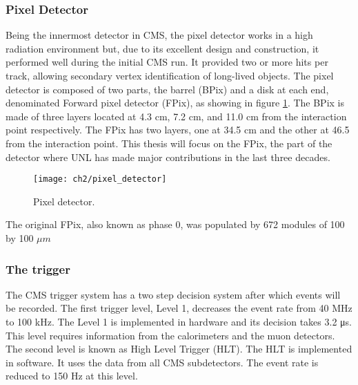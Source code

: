 \subsubsection{Pixel Detector}
Being the innermost detector in CMS, the pixel detector works in a high radiation environment but, due to its excellent design and construction, it performed well during the initial CMS run. It provided two or more hits per track, allowing secondary vertex identification of long-lived objects. The pixel detector is composed of two parts, the barrel (BPix) and a disk at each end, denominated Forward pixel detector (FPix), as showing in figure \ref{pixeldetector}. The BPix is made of three layers located at 4.3 cm, 7.2 cm, and 11.0 cm from the interaction point respectively. The FPix has two layers, one at 34.5 cm and the other at 46.5 from the interaction point. This thesis will focus on the FPix, the part of the detector where UNL has made major contributions in the last {} three decades.  

\begin{figure}[!h]
	\centering
	\texttt{[image: ch2/pixel\_detector]}
	\caption[Pixel detector]{Pixel detector.}
	\label{pixeldetector}
\end{figure}

  

The original FPix, also known as phase 0, was populated by 672 modules of 100 by 100 $\mu m$ 
\subsubsection{The trigger}
The CMS trigger system has a two step decision system after which events will be recorded.
The first trigger level, Level 1, decreases the event rate from 40 MHz to 100 kHz. The Level 1
is implemented in hardware and its decision takes 3.2 μs. This level requires information from
the calorimeters and the muon detectors. The second level is known as High Level Trigger
(HLT). The HLT is implemented in software. It uses the data from all CMS subdetectors. The
event rate is reduced to 150 Hz at this level.



